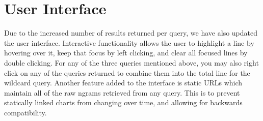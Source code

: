 \documentclass[11pt]{article}
\begin{document}
\section{User Interface}
\label{sec:interface}
Due to the increased number of results returned per query, we have also updated the user interface. Interactive functionality allows the user to highlight a line by hovering over it, keep that focus by left clicking, and clear all focused lines by double clicking. For any of the three queries mentioned above, you may also right click on any of the queries returned to combine them into the total line for the wildcard query. Another feature added to the interface is static URLs which maintain all of the raw ngrams retrieved from any query. This is to prevent statically linked charts from changing over time, and allowing for backwards compatibility.

\begin{figure}
\centering
\addtolength{\subfigcapskip}{-0.2cm}
\hspace*{-0.5cm}
\hspace*{0.1cm}

\hspace*{-0.5cm}\vspace*{-0.5cm}
\hspace*{0.1cm}
\parbox[b][]{.28\textwidth}%
{}
\end{figure}
\end{document}
